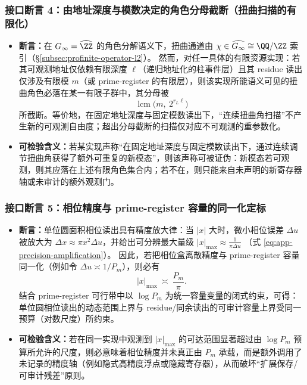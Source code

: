 \subsubsection{接口断言 4：由地址深度与模数决定的角色分母截断（扭曲扫描的有限化）}\label{app:bridgepack-assertion-4}
\begin{itemize}
  \item \textbf{断言：}在 \(G_\infty=\widehat{\ZZ}\) 的角色分解语义下，扭曲通道由 \(\chi\in\widehat{G_\infty}\cong \QQ/\ZZ\) 索引（\S\ref{subsec:profinite-operator-l2}）。
  然而，对任一具体的有限资源实现：若其可观测地址仅依赖有限深度 \(\ell\)（递归地址化的柱事件层）且其 residue 读出仅涉及有限模 \(m\)（或 prime-register 的有限层），则该实现所能语义可见的扭曲角色必落在某一有限子群中，其分母被
  \[
  \operatorname{lcm}\!\bigl(m,\ 2^{r_L\ell}\bigr)
  \]
  所截断。等价地，在固定地址深度与固定模数读出下，“连续扭曲角扫描”不产生新的可观测自由度；超出分母截断的扫描仅对应不可观测的重参数化。
  \item \textbf{可检验含义：}若某实现声称“在固定地址深度与固定模数读出下，通过连续调节扭曲角获得了额外可重复的新模态”，则该声称可被证伪：新模态若可观测，则其应落在上述有限角色集合内；若不在，则只能来自未声明的新寄存器轴或未审计的额外观测门。
\end{itemize}

\subsubsection{接口断言 5：相位精度与 prime-register 容量的同一化定标}\label{app:bridgepack-assertion-5}
\begin{itemize}
  \item \textbf{断言：}单位圆面积相位读出具有精度放大律：当 \(|x|\) 大时，微小相位误差 \(\Delta u\) 被放大为 \(\Delta x\approx \pi x^2\Delta u\)，并给出可分辨最大量级
  \(
  |x|_{\max}\approx \frac{1}{\pi\Delta u}
  \)
  （式 \eqref{eq:app-precision-amplification}）。
  因此，若把相位盒离散精度与 prime-register 容量同一化（例如令 \(\Delta u\asymp 1/P_m\)），则必有
  \[
  |x|_{\max}\ \asymp\ \frac{P_m}{\pi}.
  \]
  结合 prime-register 可行带中以 \(\log P_m\) 为统一容量变量的闭式约束，可得：单位圆相位读出的动态范围上界与 residue/同余读出的可审计容量上界受同一预算（对数尺度）所约束。
  \item \textbf{可检验含义：}若在同一实现中观测到 \(|x|_{\max}\) 的可达范围显著超过由 \(\log P_m\) 预算所允许的尺度，则必意味着相位精度并未真正由 \(P_m\) 承载，而是额外调用了未记录的精度轴（例如隐式高精度浮点或隐藏寄存器），从而破坏“扩展保存/可审计残差”原则。
\end{itemize}

